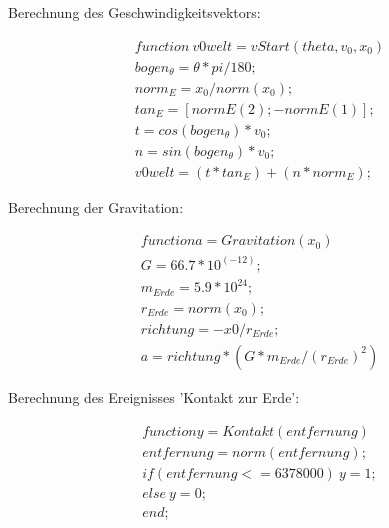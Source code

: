 \documentclass[10pt,a4paper]{article}
\begin{document}
Berechnung des Geschwindigkeitsvektors:

\begin{align}
function \: v0welt = vStart(theta, v_0, x_0)
\\bogen_\theta = \theta * pi / 180; \nonumber
\\norm_E = x_0 / norm(x_0);   \nonumber           %
\\tan_E = [normE(2) ; -normE(1)];  \nonumber    %
\\t = cos(bogen_{\theta}) * v_0;  \nonumber        %
\\n = sin(bogen_{\theta}) * v_0;   \nonumber       %
\\v0welt = (t * tan_E) + (n * norm_E);  \nonumber %
\end{align}
	
Berechnung der Gravitation:

\begin{align}
function a = Gravitation(x_0)
\\G = 66.7 * 10^(-12);  \nonumber %
\\m_{Erde} = 5.9 * 10^24;  \nonumber %
\\r_{Erde} = norm(x_0);  \nonumber %
\\richtung = -x0 / r_{Erde}; \nonumber
\\a = richtung * (G * m_{Erde} /(r_{Erde})^2) \nonumber %
\end{align}

Berechnung des Ereignisses 'Kontakt zur Erde':

\begin{align}
function y = Kontakt(entfernung)
\\entfernung = norm(entfernung); \nonumber
\\if(entfernung<=6378000) \:
    y = 1; \nonumber
\\else \: \nonumber
    y = 0; 
\\end; \nonumber
\end{align}
\end{document}
